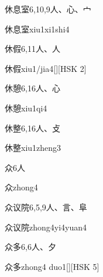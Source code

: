 \begin{Entry}{休息室}{6,10,9}{⼈、⼼、⼧}
  \begin{Phonetics}{休息室}{xiu1xi1shi4}
  \end{Phonetics}
\end{Entry}

\begin{Entry}{休假}{6,11}{⼈、⼈}
  \begin{Phonetics}{休假}{xiu1/jia4}[][HSK 2]
  \end{Phonetics}
\end{Entry}

\begin{Entry}{休憩}{6,16}{⼈、⼼}
  \begin{Phonetics}{休憩}{xiu1qi4}
  \end{Phonetics}
\end{Entry}

\begin{Entry}{休整}{6,16}{⼈、⽁}
  \begin{Phonetics}{休整}{xiu1zheng3}
  \end{Phonetics}
\end{Entry}

\begin{Entry}{众}{6}{⼈}
  \begin{Phonetics}{众}{zhong4}
  \end{Phonetics}
\end{Entry}

\begin{Entry}{众议院}{6,5,9}{⼈、⾔、⾩}
  \begin{Phonetics}{众议院}{zhong4yi4yuan4}
  \end{Phonetics}
\end{Entry}

\begin{Entry}{众多}{6,6}{⼈、⼣}
  \begin{Phonetics}{众多}{zhong4 duo1}[][HSK 5]
  \end{Phonetics}
\end{Entry}

